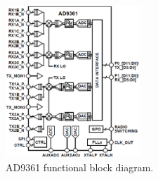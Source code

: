 %
%
%
\begin{figure}[htbp]
    \centering
    \includegraphics[width=0.45\textwidth]{./figures/ad9361_functional_diagram}
    \caption{ AD9361 functional block diagram.
    \label{fig:ad9361func}}
\end{figure}

